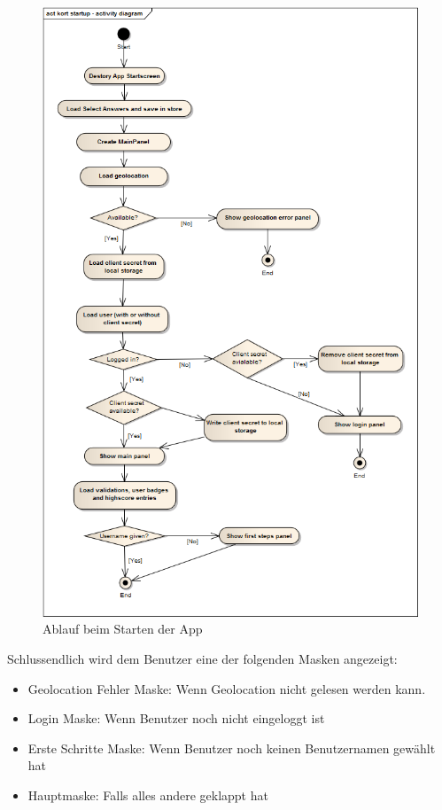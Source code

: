\begin{figure}[H]
	\centering
	\includegraphics[scale=0.55]{images/uml/kort-startup-activitydiagram}
	\caption{Ablauf beim Starten der App}
	\label{image-kort-startup-activitydiagram}
\end{figure}

Schlussendlich wird dem Benutzer eine der folgenden Masken angezeigt:

\begin{itemize}
\item Geolocation Fehler Maske: Wenn Geolocation nicht gelesen werden kann.
\item Login Maske: Wenn Benutzer noch nicht eingeloggt ist
\item Erste Schritte Maske: Wenn Benutzer noch keinen Benutzernamen gewählt hat
\item Hauptmaske: Falls alles andere geklappt hat
\end{itemize}


